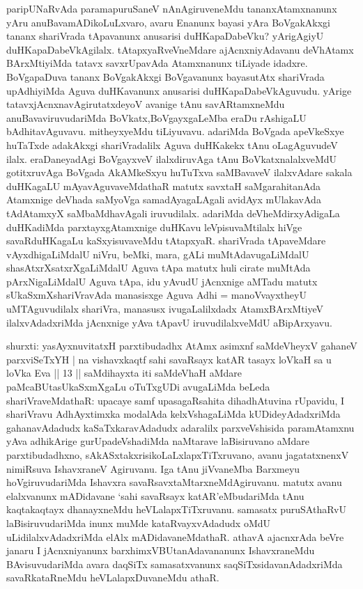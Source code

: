 \begin{artha} %
paripUNaRvAda paramapuruSaneV nAnAgiruveneMdu tananx\break Atamxnanunx yAru anuBavamADikoLuLxvaro, avaru Enanunx bayasi yAra BoVgakAkxgi tananx shariVrada tApavanunx anusarisi duHKapaDabeVku? yArigAgiyU duHKapaDabeVkAgilalx. tAtapxyaRveVneMdare \ndash  ajAcnxniyAdavanu deVhAtamx BArxMtiyiMda tatavx savxrUpavAda Atamxnanunx tiLiyade idadxre. BoVgapaDuva tananx BoVgakAkxgi BoVgavanunx bayasutAtx shariVrada upAdhiyiMda Aguva duHKavanunx anusarisi duHKapaDabeVkAguvudu. yArige tatavxjAcnxnavAgirutatxdeyoV avanige tAnu savARtamxneMdu anuBavaviruvudariMda BoVkatx,\break BoVgayxgaLeMba eraDu rAshigaLU bAdhitavAguvavu. mitheyxyeMdu tiLiyuvavu. adariMda BoVgada apeVkeSxye huTaTxde adakAkxgi shariVradalilx Aguva duHKakekx tAnu oLagAguvudeV ilalx. eraDaneyadAgi BoVgayxveV ilalxdiruvAga tAnu BoVkatxnalalxveMdU gotitxruvAga BoVgada AkAMkeSxyu huTuTxva saMBavaveV ilalxvAdare sakala duHKagaLU mAyavAguvaveMdathaR matutx savxtaH saMgarahitanAda Atamxnige deVhada saMyoVga samadAyagaLAgali avidAyx mUlakavAda tAdAtamxyX saMbaMdhavAgali iruvudilalx. adariMda deVheMdirxyAdigaLa duHKadiMda parxtayxgAtamxnige duHKavu leVpisuvaMtilalx hiVge savaRduHKagaLu kaSxyisuvaveMdu tAtapxyaR. shariVrada tApaveMdare vAyxdhigaLiMdalU niVru, beMki, mara, gALi muMtAdavugaLiMdalU shasAtxrXsatxrXgaLiMdalU Aguva tApa matutx huli cirate muMtAda pArxNigaLiMdalU Aguva tApa, idu yAvudU jAcnxnige aMTadu matutx sUkaSxmXshariVravAda manasisxge Aguva Adhi = manoVvayxtheyU uMTAguvudilalx shariVra, manasusx ivugaLalilxdadx AtamxBArxMtiyeV ilalxvAdadxriMda jAcnxnige yAva tApavU iruvudilalxveMdU aBipArxyavu. 
\end{artha}


\vishaya{}

\begin{artha}
shurxti: yasAyxnuvitatxH parxtibudadhx AtAmx asimxnf saMdeVheyxV gahaneV parxviSeTxYH | na vishavxkaqtf sahi savaRsayx katAR tasayx loVkaH sa u loVka Eva || 13 || saMdihayxta iti saMdeVhaH aMdare paMcaBUtasUkaSxmXgaLu oTuTxgUDi avugaLiMda beLeda shariVraveMdathaR: upacaye samf upasagaRsahita dihadhAtuvina rUpavidu, I shariVravu AdhAyxtimxka modalAda kelxVshagaLiMda kUDideyAdadxriMda gahanavAdadudx kaSaTxkaravAdadudx adaralilx parxveVshisida paramAtamxnu yAva adhikArige gurUpadeVshadiMda naMtarave laBisiruvano aMdare parxtibudadhxno, sAkASxtakxrisikoLaLxlapxTiTxruvano, avanu  jagatatxnenxV nimiRsuva IshavxraneV Agiruvanu. Iga tAnu jiVvaneMba Barxmeyu hoVgiruvudariMda Ishavxra savaRsavxtaMtarxneMdAgiruvanu. matutx avanu elalxvanunx mADidavane `sahi savaRsayx katAR'\ndash  eMbudariMda tAnu kaqtakaqtayx dhanayxneMdu heVLalapxTiTxruvanu. samasatx puruSAthaRvU laBisiruvudariMda inunx muMde kataRvayxvAdadudx oMdU uLidilalxvAdadxriMda elAlx mADidavaneMdathaR. athavA ajacnxrAda beVre janaru I jAcnxniyanunx barxhimxVBUtanAdavananunx IshavxraneMdu BAvisuvudariMda avara daqSiTx samasatxvanunx saqSiTxsidavanAdadxriMda savaRkataRneMdu heVLalapxDu\-\break vaneMdu athaR.
\end{artha}

